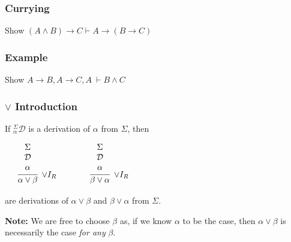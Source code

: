 \documentclass{beamer}
\begin{document}
\begin{frame}
  \frametitle{Currying}

  Show $(A \land B) \to C \vdash A \to (B \to C)$
  
  \vspace{6cm}

\end{frame}


\begin{frame}
	\frametitle{Example}

	Show $A \to B, A \to C, A \ \vdash B \land C$
	
	\vspace{6cm}

\end{frame}

\begin{frame}
	\frametitle{$\lor$ Introduction}
	
	If $^{\Sigma}_{\alpha}\mathcal{D}$ is a derivation of $\alpha$ from $\Sigma$, then 
	
	\begin{center}
		
	$\begin{array}{ c c c }	
		\begin{array}{ c c }		
			\begin{array}{c}		
				\infer[\lor I_{R}]{\alpha \lor \beta}
				{\begin{array}{c} \Sigma \\ \mathcal{D} \\ \alpha \end{array}}
			\end{array}
		\end{array}
		
		&
		
		&
		
		\begin{array}{ c c }		
			\begin{array}{c}		
				\infer[\lor I_{R}]{\beta \lor \alpha}
				{\begin{array}{c} \Sigma \\ \mathcal{D} \\ \alpha \end{array}}
			\end{array}
		\end{array}		
		
		
	\end{array}$
	\end{center}
	
	are derivations of $\alpha \lor \beta$ and $\beta \lor \alpha$ from $\Sigma$. 
	
	\vspace{1cm}
	
	{\bf Note:} We are free to choose $\beta$ as, if we know $\alpha$ to be the case, then $\alpha \lor \beta$  is necessarily the case \emph{for any }$\beta$. 
	
\end{frame}
\end{document}
